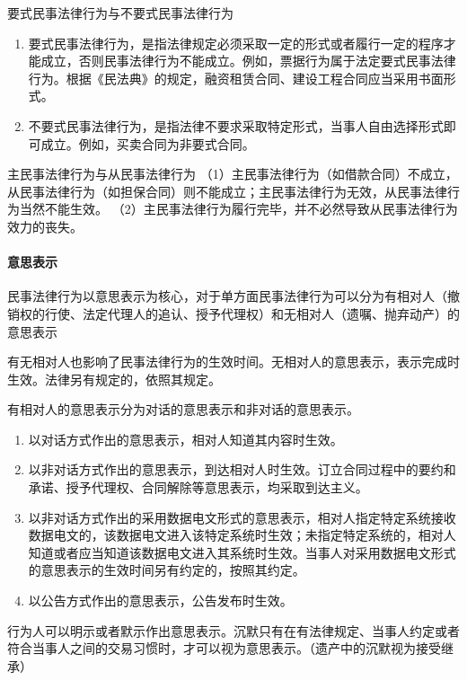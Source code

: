 \documentclass[UTF8,12pt]{ctexart}
\numberwithin{equation}{section} %
\numberwithin{figure}{section}
\numberwithin{table}{section}
\begin{document}
	要式民事法律行为与不要式民事法律行为
	\begin{enumerate}
		\item 要式民事法律行为，是指法律规定必须采取一定的形式或者履行一定的程序才能成立，否则民事法律行为不能成立。例如，票据行为属于法定要式民事法律行为。根据《民法典》的规定，融资租赁合同、建设工程合同应当采用书面形式。
		
		\item 不要式民事法律行为，是指法律不要求采取特定形式，当事人自由选择形式即可成立。例如，买卖合同为非要式合同。
	\end{enumerate}
	
	主民事法律行为与从民事法律行为
	（1）主民事法律行为（如借款合同）不成立，从民事法律行为（如担保合同）则不能成立；主民事法律行为无效，从民事法律行为当然不能生效。
	（2）主民事法律行为履行完毕，并不必然导致从民事法律行为效力的丧失。
	
	\paragraph{意思表示}
	民事法律行为以意思表示为核心，对于单方面民事法律行为可以分为有相对人（撤销权的行使、法定代理人的追认、授予代理权）和无相对人（遗嘱、抛弃动产）的意思表示
	
	有无相对人也影响了民事法律行为的生效时间。无相对人的意思表示，表示完成时生效。法律另有规定的，依照其规定。
	
	有相对人的意思表示分为对话的意思表示和非对话的意思表示。
	\begin{enumerate}
		\item 以对话方式作出的意思表示，相对人知道其内容时生效。
		
		\item 以非对话方式作出的意思表示，到达相对人时生效。订立合同过程中的要约和承诺、授予代理权、合同解除等意思表示，均采取到达主义。
		
		\item 以非对话方式作出的采用数据电文形式的意思表示，相对人指定特定系统接收数据电文的，该数据电文进入该特定系统时生效；未指定特定系统的，相对人知道或者应当知道该数据电文进入其系统时生效。当事人对采用数据电文形式的意思表示的生效时间另有约定的，按照其约定。
		
		\item 以公告方式作出的意思表示，公告发布时生效。
	\end{enumerate}
	
	行为人可以明示或者默示作出意思表示。沉默只有在有法律规定、当事人约定或者符合当事人之间的交易习惯时，才可以视为意思表示。（遗产中的沉默视为接受继承）
	
\end{document}
